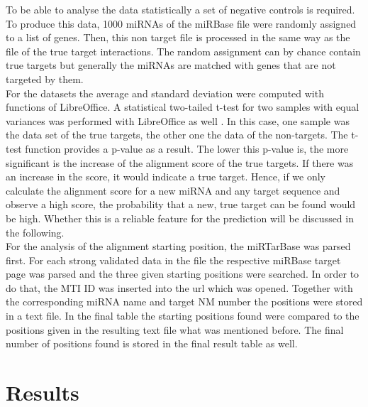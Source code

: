 \documentclass[11pt, a4paper, oneside]{book}
\begin{document}
To be able to analyse the data statistically a set of negative controls is required. To produce this data, 1000 miRNAs of the miRBase file were randomly assigned to a list of genes. Then, this non target file is processed in the same way as the file of the true target interactions. The random assignment can by chance contain true targets but generally the miRNAs are matched with genes that are not targeted by them. \\

For the datasets the average and standard deviation were computed with functions of LibreOffice. A statistical two-tailed t-test for two samples with equal variances was performed with LibreOffice as well \cite{ttest}. In this case, one sample was the data set of the true targets, the other one the data of the non-targets. The t-test function provides a p-value as a result. The lower this p-value is, the more significant is the increase of the alignment score of the true targets. If there was an increase in the score, it would indicate a true target. Hence, if we only calculate the alignment score for a new miRNA and any target sequence and observe a high score, the probability that a new, true target can be found would be high. Whether this is a reliable feature for the prediction will be discussed in the following.\\

For the analysis of the alignment starting position, the miRTarBase was parsed first. For each strong validated data in the file the respective miRBase target page was parsed and the three given starting positions were searched. In order to do that, the MTI ID was inserted into the url which was opened. Together with the corresponding miRNA name and target NM number the positions were stored in a text file. In the final table the starting positions found were compared to the positions given in the resulting text file what was mentioned before. The final number of positions found is stored in the final result table as well. 



\vspace{1cm}



\chapter{Results}
\label{chapter:results}
\end{document}
